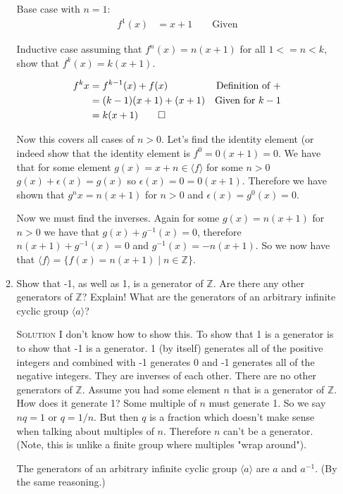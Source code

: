 \documentclass[twoside]{amsart}
\newcommand{\Integers}{\ensuremath{\mathbb{Z}{}}\xspace}
\newcommand{\solution}{\textsc{Solution}\xspace}
\newcommand{\blank}{\vspace{5pt}}
\newcommand{\ind}{\hspace{.35in}}
\newcommand{\itm}{\blank\item}
\newcommand{\sol}{\blank\noindent\solution}
\begin{document}
\begin{enumerate}[A.]
\begin{enumerate}[1)]
      Base case with $n = 1$:
      \begin{align*}
        f^1(x) &= x + 1 \qquad \text{Given}
      \end{align*}

      Inductive case assuming that $f^n(x) = n(x + 1)$ for all $1 <=
      n < k$, show that $f^k(x) = k(x + 1)$.

      \begin{align*}
        f^k{x} &= f^{k-1}(x) + f(x) & \text{Definition of +}\\
        &= (k-1)(x+1) + (x+1) & \text{Given for $k-1$} \\
        &= k(x+1) \qedhere
      \end{align*}

      Now this covers all cases of $n > 0$. Let's find the identity
      element (or indeed show that the identity element is $f^{0} = 0(x
      + 1) = 0$. We have that for some element $g(x) = x + n \in \langle f
      \rangle$ for some $n > 0$ $g(x) + \epsilon(x) = g(x)$ so
      $\epsilon(x) = 0 = 0(x+1)$. Therefore we have shown that $g^n{x}
      = n(x+1)$ for $n > 0$ and $\epsilon(x) = g^0(x) = 0$.


      Now we must find the inverses. Again for some $g(x) = n(x+1)$
      for $n > 0$ we have that $g(x) + g^{-1}(x) = 0$, therefore
      $n(x+1) + g^{-1}(x) = 0$ and $g^{-1}(x) = -n(x+1)$. So we now
      have that $\langle f \rangle = \{f(x) = n(x+1) \mid n \in \Integers\}$.


      \itm Show that -1, as well as 1, is a generator of $\Integers$. Are there
      any other generators of $\Integers$? Explain! What are the generators
      of an arbitrary infinite cyclic group $\langle a \rangle$?

      \sol I don't know how to show this. To show that 1 is a generator is
      to show that -1 is a generator. 1 (by itself) generates all of the
      positive integers and combined with -1 generates 0 and -1 generates
      all of the negative integers. They are inverses of each other.
      There are no other generators of $\Integers$. Assume you had some
      element $n$ that is a generator of $\Integers$. How does it
      generate 1? Some multiple of $n$ must generate 1. So we say
      $nq = 1$ or $q = 1/n$. But then $q$ is a fraction which doesn't make
      sense when talking about multiples of $n$. Therefore $n$ can't
      be a generator. (Note, this is unlike a finite group where 
      multiples "wrap around").
      
      \ind The generators of an arbitrary infinite cyclic group $\langle a
      \rangle$ are $a$ and $a^{-1}$. (By the same reasoning.)


\end{enumerate}
\end{enumerate}
\end{document}
